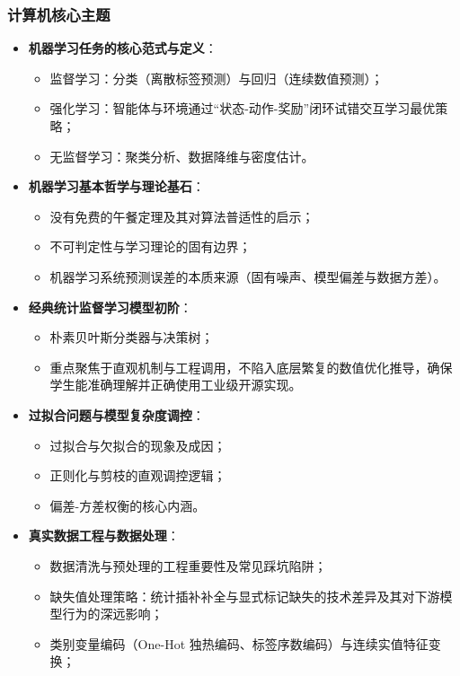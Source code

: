 \subsubsection{计算机核心主题}
\begin{itemize}
    \item \textbf{机器学习任务的核心范式与定义}：
    \begin{itemize}
        \item 监督学习：分类（离散标签预测）与回归（连续数值预测）；
        \item 强化学习：智能体与环境通过“状态-动作-奖励”闭环试错交互学习最优策略；
        \item 无监督学习：聚类分析、数据降维与密度估计。
    \end{itemize}
    \item \textbf{机器学习基本哲学与理论基石}：
    \begin{itemize}
        \item 没有免费的午餐定理及其对算法普适性的启示；
        \item 不可判定性与学习理论的固有边界；
        \item 机器学习系统预测误差的本质来源（固有噪声、模型偏差与数据方差）。
    \end{itemize}
    \item \textbf{经典统计监督学习模型初阶}：
    \begin{itemize}
        \item 朴素贝叶斯分类器与决策树；
        \item 重点聚焦于直观机制与工程调用，不陷入底层繁复的数值优化推导，确保学生能准确理解并正确使用工业级开源实现。
    \end{itemize}
    \item \textbf{过拟合问题与模型复杂度调控}：
    \begin{itemize}
        \item 过拟合与欠拟合的现象及成因；
        \item 正则化与剪枝的直观调控逻辑；
        \item 偏差-方差权衡的核心内涵。
    \end{itemize}
    \item \textbf{真实数据工程与数据处理}：
    \begin{itemize}
        \item 数据清洗与预处理的工程重要性及常见踩坑陷阱；
        \item 缺失值处理策略：统计插补补全与显式标记缺失的技术差异及其对下游模型行为的深远影响；
        \item 类别变量编码（One-Hot 独热编码、标签序数编码）与连续实值特征变换；

\end{itemize}
\end{itemize}
